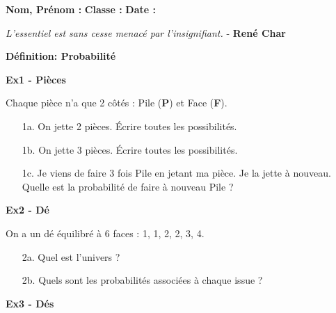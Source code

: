



\textbf{Nom, Prénom :} \hspace{8cm} \textbf{Classe :} \hspace{3cm} \textbf{Date :}\\

\begin{center}
  \textit{L’essentiel est sans cesse menacé par l’insignifiant.} - \textbf{René Char}
\end{center}

\textbf{Définition: Probabilité} \\ \Pointilles[2]

\textbf{Ex1 - Pièces}

Chaque pièce n'a que 2 côtés : Pile (\textbf{P}) et Face (\textbf{F}).

\begin{enumerate}
  \item[1a.] On jette 2 pièces. Écrire toutes les possibilités. \\\Pointilles[1]
  \item[1b.] On jette 3 pièces. Écrire toutes les possibilités. \\\Pointilles[3]
  \item[1c.] Je viens de faire 3 fois Pile en jetant ma pièce. Je la jette à nouveau. Quelle est la probabilité de faire à nouveau Pile ? \dotfill
\end{enumerate}  

\textbf{Ex2 - Dé}

On a un dé équilibré à 6 faces : 1, 1, 2, 2, 3, 4.

\begin{enumerate}
  \item[2a.] Quel est l'univers ? \dotfill
  \item[2b.] Quels sont les probabilités associées à chaque issue ? \\ \Pointilles[2]
\end{enumerate}  


\textbf{Ex3 - Dés}

